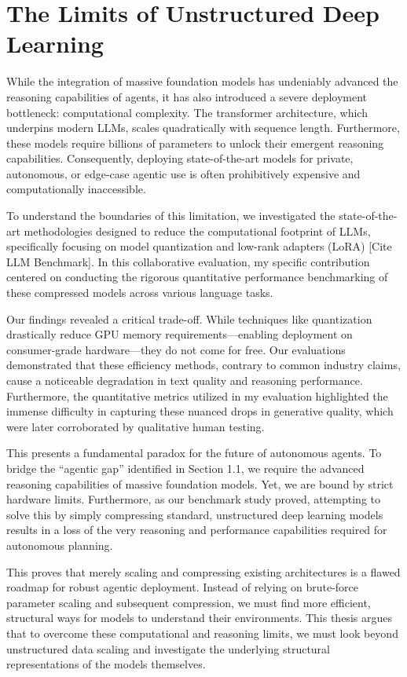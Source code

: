 \section{The Limits of Unstructured Deep Learning}

While the integration of massive foundation models has undeniably advanced the reasoning capabilities of agents, it has also introduced a severe deployment bottleneck: computational complexity. The transformer architecture, which underpins modern LLMs, scales quadratically with sequence length. Furthermore, these models require billions of parameters to unlock their emergent reasoning capabilities. Consequently, deploying state-of-the-art models for private, autonomous, or edge-case agentic use is often prohibitively expensive and computationally inaccessible.

To understand the boundaries of this limitation, we investigated the state-of-the-art methodologies designed to reduce the computational footprint of LLMs, specifically focusing on model quantization and low-rank adapters (LoRA) [Cite LLM Benchmark]. In this collaborative evaluation, my specific contribution centered on conducting the rigorous quantitative performance benchmarking of these compressed models across various language tasks. 

Our findings revealed a critical trade-off. While techniques like quantization drastically reduce GPU memory requirements---enabling deployment on consumer-grade hardware---they do not come for free. Our evaluations demonstrated that these efficiency methods, contrary to common industry claims, cause a noticeable degradation in text quality and reasoning performance. Furthermore, the quantitative metrics utilized in my evaluation highlighted the immense difficulty in capturing these nuanced drops in generative quality, which were later corroborated by qualitative human testing. 

This presents a fundamental paradox for the future of autonomous agents. To bridge the ``agentic gap'' identified in Section 1.1, we require the advanced reasoning capabilities of massive foundation models. Yet, we are bound by strict hardware limits. Furthermore, as our benchmark study proved, attempting to solve this by simply compressing standard, unstructured deep learning models results in a loss of the very reasoning and performance capabilities required for autonomous planning. 

This proves that merely scaling and compressing existing architectures is a flawed roadmap for robust agentic deployment. Instead of relying on brute-force parameter scaling and subsequent compression, we must find more efficient, structural ways for models to understand their environments. This thesis argues that to overcome these computational and reasoning limits, we must look beyond unstructured data scaling and investigate the underlying structural representations of the models themselves.


